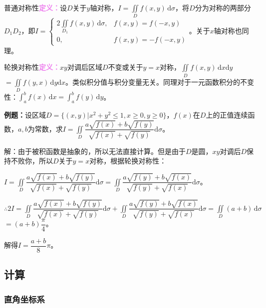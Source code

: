 \documentclass[UTF8, 12pt]{ctexart}
\begin{document}
        普通对称性\textcolor{violet}{\textbf{定义：}}设$D$关于$y$轴对称，$I=\iint\limits_Df(x,y)\,\textrm{d}\sigma$，将$D$分为对称的两部分$D_1D_2$，即$I=\left\{\begin{array}{ll}
                                                                                                                                                                2\iint\limits_{D_1}f(x,y)\,\textrm{d}\sigma, & f(x,y)=f(-x,y) \\
                                                                                                                                                                0, & f(x,y)=-f(-x,y)
        \end{array}\right.$。关于$x$轴对称也同理。

        轮换对称性\textcolor{violet}{\textbf{定义：}}$xy$对调后区域$D$不变或关于$y=x$对称，$\iint\limits_Df(x,y)\,\textrm{d}x\textrm{d}y$\\$=\iint\limits_Df(y,x)\,\textrm{d}y\textrm{d}x$。类似积分值与积分变量无关。同理对于一元函数积分的不变性：$\int_a^bf(x)\,\textrm{d}x=\int_a^bf(y)\,\textrm{d}y$。

        \textbf{例题：}设区域$D=\{(x,y)|x^2+y^2\leqslant1,x\geqslant0,y\geqslant0\}$，$f(x)$在$D$上的正值连续函数，$a,b$为常数，求$I=\displaystyle{\iint\limits_D\dfrac{a\sqrt{f(x)}+b\sqrt{f(y)}}{\sqrt{f(x)}+\sqrt{f(y)}}\textrm{d}\sigma}$。

        解：由于被积函数是抽象的，所以无法直接计算。但是由于$D$是圆，$xy$对调后$D$保持不败你，所以$D$关于$y=x$对称，根据轮换对称性：\medskip

        $I=\displaystyle{\iint\limits_D\dfrac{a\sqrt{f(x)}+b\sqrt{f(y)}}{\sqrt{f(x)}+\sqrt{f(y)}}\textrm{d}\sigma=\iint\limits_D\dfrac{a\sqrt{f(y)}+b\sqrt{f(x)}}{\sqrt{f(y)}+\sqrt{f(x)}}\textrm{d}\sigma}$。

        $\therefore2I=\displaystyle{\iint\limits_D\dfrac{a\sqrt{f(x)}+b\sqrt{f(y)}}{\sqrt{f(x)}+\sqrt{f(y)}}\textrm{d}\sigma+\iint\limits_D\dfrac{a\sqrt{f(y)}+b\sqrt{f(x)}}{\sqrt{f(y)}+\sqrt{f(x)}}\textrm{d}\sigma}=\iint\limits_D(a+b)\,\textrm{d}\sigma$\\$=(a+b)\dfrac{\pi}{4}$。

        解得$I=\dfrac{a+b}{8}\pi$。

        \subsection{计算}

        \subsubsection{直角坐标系}
\end{document}
